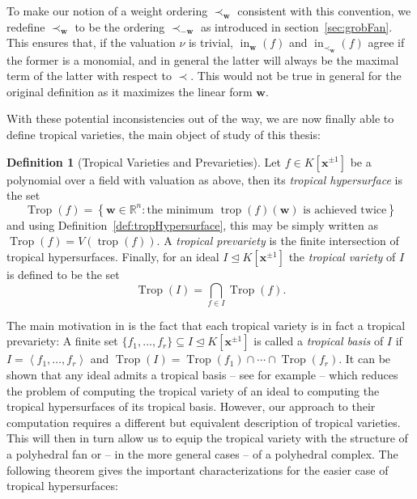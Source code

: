 \documentclass[
  paper=a4,
  titlepage,
  bibliography=totoc,
  listof=totoc,
  pagesize=pdftex
]{scrartcl}
\numberwithin{figure}{section}
\numberwithin{equation}{section}
\numberwithin{table}{section}
\newcommand*\setR{\mathds{R}}
\newcommand*\ideal[1]{\left\langle #1 \right\rangle}
\let\vec\mathbf
\let\idealof\trianglelefteq
\DeclareMathOperator{\Trop}{Trop}
\DeclareMathOperator{\trop}{trop}
\DeclareMathOperator{\initial}{in}
\theoremstyle{definition}
\newtheorem{definition}{Definition}
\numberwithin{definition}{section}
\begin{document}
To make our notion of a weight ordering $\prec_{\vec w}$ consistent with this convention,
we redefine $\prec_{\vec w}$ to be the ordering $\prec_{-\vec w}$ as introduced in
section~\ref{sec:grobFan}. This ensures that, if the valuation $\nu$ is trivial,
$\initial_{\vec w}(f)$ and $\initial_{\prec_{\vec w}}(f)$ agree if the former is a
monomial, and in general the latter will always be the maximal term of the latter with
respect to $\prec$. This would not be true in general for the original definition as it
maximizes the linear form $\vec w$.

With these potential inconsistencies out of the way, we are now finally able to define
tropical varieties, the main object of study of this thesis:

\begin{definition}[Tropical Varieties and Prevarieties]
  \label{def:tropicalVariety}
  Let $f \in K[\vec x^{\pm1}]$ be a polynomial over a field with valuation as above, then
  its \emph{tropical hypersurface} is the set
  \[
    \Trop(f) = \left\{
      \vec w \in \setR^n :
      \text{the minimum $\trop(f)(\vec w)$ is achieved twice}
    \right\}
  \]
  and using Definition~\ref{def:tropHypersurface}, this may be simply written as $\Trop(f)
  = V(\trop(f))$. A \emph{tropical prevariety} is the finite intersection of tropical
  hypersurfaces. Finally, for an ideal $I \idealof K[\vec x^{\pm1}]$ the \emph{tropical
  variety} of $I$ is defined to be the set
  \[
    \Trop(I) = \bigcap_{f \in I} \Trop(f).
  \]
\end{definition}

The main motivation in \cite{compTropVar} is the fact that each tropical variety is in
fact a tropical prevariety: A finite set $\{ f_1, \dots, f_r \} \subseteq I \idealof
K[\vec x^{\pm1}]$ is called a \emph{tropical basis} of $I$ if $I = \ideal{f_1, \dots,
f_r}$ and $\Trop(I) = \Trop(f_1) \cap \cdots \cap \Trop(f_r)$. It can be shown that any
ideal admits a tropical basis -- see for example \cite[Theorem~2.9]{compTropVar} -- which
reduces the problem of computing the tropical variety of an ideal to computing the
tropical hypersurfaces of its tropical basis. However, our approach to their computation
requires a different but equivalent description of tropical varieties. This will then in
turn allow us to equip the tropical variety with the structure of a polyhedral fan or --
in the more general cases -- of a polyhedral complex. The following theorem gives the
important characterizations for the easier case of tropical hypersurfaces:
\end{document}
